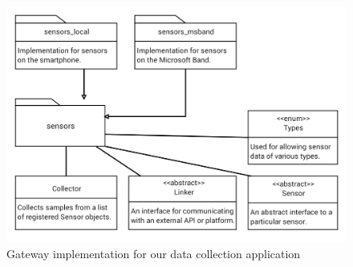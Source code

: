 \begin{figure}
	\includegraphics[width=1.0\textwidth]{figs/gateway}
	\caption{Gateway implementation for our data collection application}
	\label{fig:gateway}
\end{figure}
